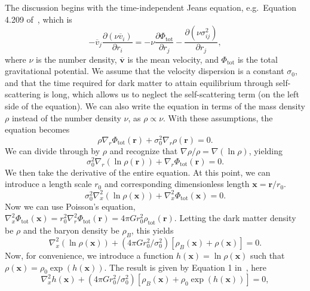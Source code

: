 The discussion begins with the time-independent Jeans equation, e.g.~Equation
4.209 of~\cite{binney_galactic_2008}, which is 
\begin{equation}
    - \overline{v}_j \frac{\partial (\nu \overline{v}_i)}{\partial r_i} 
    = - \nu \frac{\partial \Phi_{\text{tot}}}{\partial r_j} 
    - \frac{\partial (\nu \sigma_{ij}^2)}{\partial r_j},
\end{equation}
where $\nu$ is the number density, $\overline{\mathbf{v}}$ is the mean
velocity, and $\Phi_{\text{tot}}$ is the total gravitational potential.  We
assume that the velocity dispersion is a constant $\sigma_0$, and that the
time required for dark matter to attain equilibrium through self-scattering is
long, which allows us to neglect the self-scattering term (on the left side of
the equation).  We can also write the equation in terms of the mass density
$\rho$ instead of the number density $\nu$, as $\rho \propto \nu$.  With these
assumptions, the equation becomes
\begin{equation}
    \rho \nabla_r \Phi_{\text{tot}}(\mathbf{r}) + \sigma_0^2 \nabla_r
    \rho(\mathbf{r}) = 0.
\end{equation}
We can divide through by $\rho$ and recognize that $\nabla \rho / \rho = \nabla
(\ln \rho)$, yielding 
\begin{equation}
    \sigma_0^2 \nabla_r (\ln \rho(\mathbf{r})) + \nabla_r
    \Phi_{\text{tot}}(\mathbf{r}) = 0.
\end{equation}
We then take the derivative of the entire equation.  At this point, we can
introduce a length scale $r_0$ and corresponding dimensionless length
$\mathbf{x} = \mathbf{r} / r_0$.
\begin{equation}
    \sigma_0^2 \nabla_x^2 (\ln \rho(\mathbf{x})) + \nabla_x^2
    \Phi_{\text{tot}}(\mathbf{x}) = 0.
\end{equation}
Now we can use Poisson's equation, $\nabla_x^2 \Phi_{\text{tot}}(\mathbf{x}) =
r_0^2 \nabla_r^2 \Phi_{\text{tot}}(\mathbf{r}) = 4 \pi G r_0^2
\rho_{\text{tot}}(\mathbf{r})$.  Letting the dark matter density be $\rho$ and
the baryon density be $\rho_B$, this yields
\begin{equation}
    \nabla_x^2 (\ln \rho(\mathbf{x})) + (4 \pi G r_0^2/\sigma_0^2) \left[ \rho_B (\mathbf{x}) + \rho(\mathbf{x}) \right] = 0.
\end{equation}
Now, for convenience, we introduce a function $h(\mathbf{x}) = \ln
\rho(\mathbf{x})$ such that $\rho(\mathbf{x}) = \rho_0 \exp(h(\mathbf{x}))$.
The result is given by Equation 1 in~\cite{kaplinghat_tying_2014}, here
\begin{equation}
\nabla_x^2 h(\mathbf{x}) + (4\pi G r_0^2/\sigma_0^2)
\left[\rho_B(\mathbf{x}) + \rho_0 \exp\left(h(\mathbf{x})\right)\right] = 0,
\end{equation}

